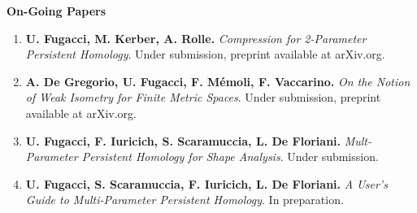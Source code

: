 \documentclass[11pt]{article}
\begin{document}
\noindent
{\bf On-Going Papers}
\begin{enumerate}

\item{\bf U. Fugacci, M. Kerber, A. Rolle.} {\em Compression for 2-Parameter Persistent Homology}. Under submission, preprint available at arXiv.org.

\item {\bf A. De Gregorio, U. Fugacci, F. M\'emoli, F. Vaccarino.} {\em On the Notion of Weak Isometry for Finite Metric Spaces}. Under submission, preprint available at arXiv.org.

\item {\bf U. Fugacci, F. Iuricich, S. Scaramuccia, L. De Floriani.} {\em Mult-Parameter Persistent Homology for Shape Analysis}. Under submission.

\item{\bf U. Fugacci, S. Scaramuccia, F. Iuricich, L. De Floriani.} {\em A User's Guide to Multi-Parameter Persistent Homology}. In preparation.





%
%
%
%
%




\end{enumerate}
\end{document}
